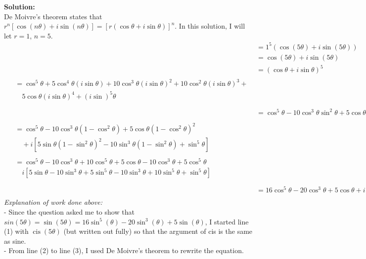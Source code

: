 \documentclass[12pt]{book}
\DeclareMathOperator\cis{cis} %
\begin{document}
\begin{enumerate}
\begin{enumerate}
\textbf{Solution:}\\
De Moivre's theorem states that $r^n[\cos(n\theta)+i\sin(n\theta)] = [r(\cos\theta+i\sin\theta)]^n$. In this solution, I will let $r=1$, $n=5$.
\setcounter{equation}{0}
\begin{align}
    &= 1^5 (\cos(5\theta) + i\sin(5\theta)) \\
    &= \cos(5\theta) + i\sin(5\theta) \\
    &= (\cos\theta + i\sin\theta)^5 \\
    \begin{split}
        &= \cos^5\theta + 5\cos^4\theta(i\sin\theta) + 10\cos^3\theta(i\sin\theta)^2 + 10\cos^2\theta(i\sin\theta)^3 + \\
        & \quad  5\cos\theta(i\sin\theta)^4 + (i\sin)^5\theta\\
    \end{split}\\
    &= \cos^5\theta - 10 \cos^3\theta\sin^2\theta + 5\cos\theta\sin^4\theta + i[5\cos^4\theta\sin\theta - 10\cos^2\sin^3\theta + \sin^5\theta]\\
    \begin{split}
        &= \cos^5\theta - 10\cos^3\theta(1-\cos^2\theta) + 5\cos\theta(1-\cos^2\theta)^2 \\
        & \quad +i[5\sin\theta(1-\sin^2\theta)^2 - 10\sin^3\theta(1-\sin^2\theta) + \sin^5\theta]
    \end{split}\\
    \begin{split}
        &= \cos^5\theta - 10\cos^3\theta + 10\cos^5\theta + 5\cos\theta - 10\cos^3\theta + 5\cos^5\theta \\
        & \quad i[5\sin\theta - 10\sin^3\theta + 5\sin^5\theta - 10\sin^3\theta + 10\sin^5\theta + \sin^5\theta]\\
    \end{split}\\
    &= 16\cos^5\theta - 20\cos^3\theta + 5\cos\theta + i(16\sin^5\theta - 20\sin^3\theta + 5\sin\theta)
\end{align}
\textit{Explanation of work done above:}\\
- Since the question asked me to show that $sin(5\theta) = \sin(5\theta) = 16\sin^5(\theta) - 20\sin^3(\theta) + 5\sin(\theta)$, I started line (1) with $\cis(5\theta)$ (but written out fully) so that the argument of cis is the same as sine.\\
- From line (2) to line (3), I used De Moivre's theorem to rewrite the equation.\\

\end{enumerate}
\end{enumerate}
\end{document}
